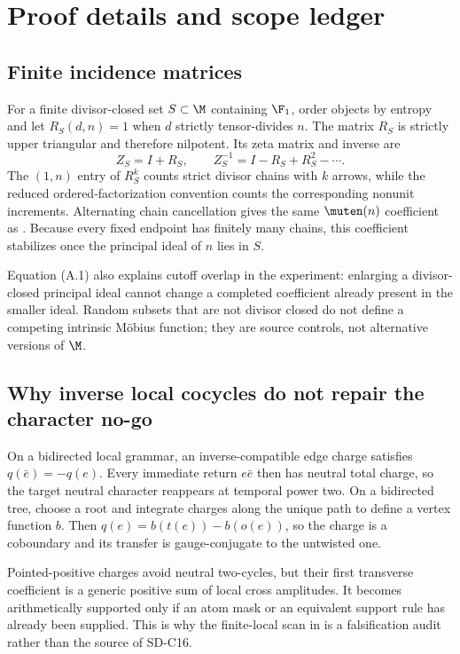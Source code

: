 \section{Proof details and scope ledger}
\label{app:proofs}

\subsection{Finite incidence matrices}

For a finite divisor-closed set $S\subset\M$ containing $\F_1$, order objects
by entropy and let $R_S(d,n)=1$ when $d$ strictly tensor-divides $n$.  The
matrix $R_S$ is strictly upper triangular and therefore nilpotent.  Its zeta
matrix and inverse are
\[
  Z_S=I+R_S,
  \qquad
  Z_S^{-1}=I-R_S+R_S^2-\cdots.
  \tag{A.1}
\]
The $(1,n)$ entry of $R_S^k$ counts strict divisor chains with $k$ arrows,
while the reduced ordered-factorization convention counts the corresponding
nonunit increments.  Alternating chain cancellation gives the same
$\muten(n)$ coefficient as .  Because every fixed endpoint
has finitely many chains, this coefficient stabilizes once the principal
ideal of $n$ lies in $S$.

Equation (A.1) also explains cutoff overlap in the experiment: enlarging a
divisor-closed principal ideal cannot change a completed coefficient already
present in the smaller ideal.  Random subsets that are not divisor closed do
not define a competing intrinsic M\"obius function; they are source controls,
not alternative versions of $\M$.

\subsection{Why inverse local cocycles do not repair the character no-go}

On a bidirected local grammar, an inverse-compatible edge charge satisfies
$q(\bar e)=-q(e)$.  Every immediate return $e\bar e$ then has neutral total
charge, so the target neutral character reappears at temporal power two.  On
a bidirected tree, choose a root and integrate charges along the unique path
to define a vertex function $b$.  Then $q(e)=b(t(e))-b(o(e))$, so the charge
is a coboundary and its transfer is gauge-conjugate to the untwisted one.

Pointed-positive charges avoid neutral two-cycles, but their first transverse
coefficient is a generic positive sum of local cross amplitudes.  It becomes
arithmetically supported only if an atom mask or an equivalent support rule
has already been supplied.  This is why the finite-local scan in
 is a falsification audit rather than the source of SD-C16.
